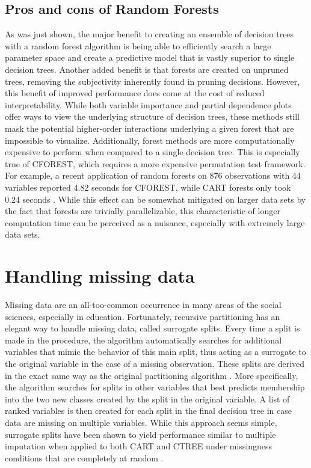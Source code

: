 
\subsection{Pros and cons of Random Forests}


	As was just shown, the major benefit to creating an ensemble of decision trees with a random forest algorithm is being able to efficiently search a large parameter space and create a predictive model that is vastly superior to single decision trees. Another added benefit is that forests are created on unpruned trees, removing the subjectivity inherently found in pruning decisions. However, this benefit of improved performance does come at the cost of reduced interpretability. While both variable importance and partial dependence plots offer ways to view the underlying structure of decision trees, these methods still mask the potential higher-order interactions underlying a given forest that are impossible to visualize. Additionally, forest methods are more computationally expensive to perform when compared to a single decision tree. This is especially true of CFOREST, which requires a more expensive permutation test framework. For example, a recent application of random forests on 876 observations with 44 variables reported 4.82 seconds for CFOREST, while CART forests only took 0.24 seconds \cite{strobl2007bias}. While this effect can be somewhat mitigated on larger data sets by the fact that forests are trivially parallelizable, this characteristic of longer computation time can be perceived as a nuisance, especially with extremely large data sets. 



\section{Handling missing data}


	Missing data are an all-too-common occurrence in many areas of the social sciences, especially in education. Fortunately, recursive partitioning has an elegant way to handle missing data, called surrogate splits. Every time a split is made in the procedure, the algorithm automatically searches for additional variables that mimic the behavior of this main split, thus acting as a surrogate to the original variable in the case of a missing observation. These splits are derived in the exact same way as the original partitioning algorithm \cite{hothorn2006unbiased, therneau2014introduction}. More specifically, the algorithm searches for splits in other variables that best predicts membership into the two new classes created by the split in the original variable. A list of ranked variables is then created for each split in the final decision tree in case data are missing on multiple variables. While this approach seems simple, surrogate splits have been shown to yield performance similar to multiple imputation when applied to both CART and CTREE under missingness conditions that are completely at random \cite{hapfelmeier2012recursive}.


